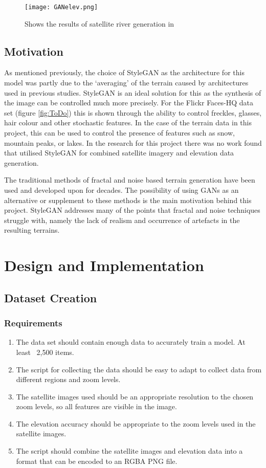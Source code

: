 \documentclass[a4paper]{report}
\begin{document}
\begin{figure}[H]
    \centering
        \texttt{[image: GANelev.png]}
        \caption{Shows the results of satellite river generation in \cite{riverSat}}
        \label{fig:elevGAN}
\end{figure}

\subsection{Motivation}
As mentioned previously, the choice of StyleGAN as the architecture for this model was partly due to the `averaging' of the terrain caused by architectures used in previous studies. StyleGAN is an ideal solution for this as the synthesis of the image can be controlled much more precisely. For the Flickr Faces-HQ data set (figure \ref{fig:ToDo}) this is shown through the ability to control freckles, glasses, hair colour and other stochastic features. In the case of the terrain data in this project, this can be used to control the presence of features such as snow, mountain peaks, or lakes. In the research for this project there was no work found that utilised StyleGAN for combined satellite imagery and elevation data generation.

The traditional methods of fractal and noise based terrain generation have been used and developed upon for decades. The possibility of using GANs as an alternative or supplement to these methods is the main motivation behind this project. StyleGAN addresses many of the points that fractal and noise techniques struggle with, namely the lack of realism and occurrence of artefacts in the resulting terrains.
\section{Design and Implementation}
\subsection{Dataset Creation}
\subsubsection{Requirements}
\begin{enumerate}
    \item The data set should contain enough data to accurately train a model. At least ~2,500 items.
    \item The script for collecting the data should be easy to adapt to collect data from different regions and zoom levels.
    \item The satellite images used should be an appropriate resolution to the chosen zoom levels, so all features are visible in the image.
    \item The elevation accuracy should be appropriate to the zoom levels used in the satellite images.
    \item The script should combine the satellite images and elevation data into a format that can be encoded to an RGBA PNG file.
\end{enumerate}
\end{document}
